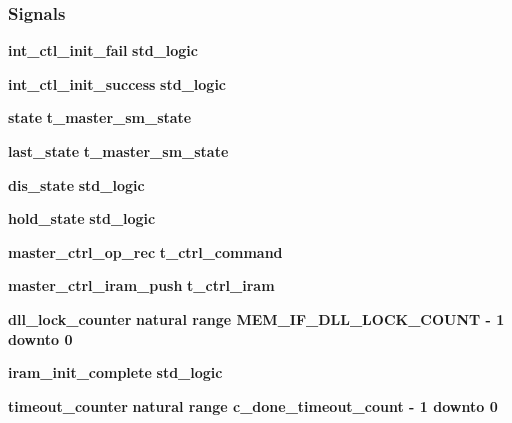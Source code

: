 \subsubsection*{Signals}
 \begin{DoxyCompactItemize}
\item 
{\bf int\+\_\+ctl\+\_\+init\+\_\+fail} {\bfseries \textcolor{comment}{std\+\_\+logic}\textcolor{vhdlchar}{ }} 
\item 
{\bf int\+\_\+ctl\+\_\+init\+\_\+success} {\bfseries \textcolor{comment}{std\+\_\+logic}\textcolor{vhdlchar}{ }} 
\item 
{\bf state} {\bfseries {\bfseries {\bf t\+\_\+master\+\_\+sm\+\_\+state}} \textcolor{vhdlchar}{ }} 
\item 
{\bf last\+\_\+state} {\bfseries {\bfseries {\bf t\+\_\+master\+\_\+sm\+\_\+state}} \textcolor{vhdlchar}{ }} 
\item 
{\bf dis\+\_\+state} {\bfseries \textcolor{comment}{std\+\_\+logic}\textcolor{vhdlchar}{ }} 
\item 
{\bf hold\+\_\+state} {\bfseries \textcolor{comment}{std\+\_\+logic}\textcolor{vhdlchar}{ }} 
\item 
{\bf master\+\_\+ctrl\+\_\+op\+\_\+rec} {\bfseries {\bfseries {\bf t\+\_\+ctrl\+\_\+command}} \textcolor{vhdlchar}{ }} 
\item 
{\bf master\+\_\+ctrl\+\_\+iram\+\_\+push} {\bfseries {\bfseries {\bf t\+\_\+ctrl\+\_\+iram}} \textcolor{vhdlchar}{ }} 
\item 
{\bf dll\+\_\+lock\+\_\+counter} {\bfseries \textcolor{comment}{natural}\textcolor{vhdlchar}{ }\textcolor{vhdlchar}{ }\textcolor{vhdlchar}{ }\textcolor{keywordflow}{range}\textcolor{vhdlchar}{ }\textcolor{vhdlchar}{ }\textcolor{vhdlchar}{ }\textcolor{vhdlchar}{ }{\bfseries {\bf M\+E\+M\+\_\+\+I\+F\+\_\+\+D\+L\+L\+\_\+\+L\+O\+C\+K\+\_\+\+C\+O\+U\+NT}} \textcolor{vhdlchar}{-\/}\textcolor{vhdlchar}{ } \textcolor{vhdldigit}{1} \textcolor{vhdlchar}{ }\textcolor{keywordflow}{downto}\textcolor{vhdlchar}{ }\textcolor{vhdlchar}{ } \textcolor{vhdldigit}{0} \textcolor{vhdlchar}{ }} 
\item 
{\bf iram\+\_\+init\+\_\+complete} {\bfseries \textcolor{comment}{std\+\_\+logic}\textcolor{vhdlchar}{ }} 
\item 
{\bf timeout\+\_\+counter} {\bfseries \textcolor{comment}{natural}\textcolor{vhdlchar}{ }\textcolor{vhdlchar}{ }\textcolor{vhdlchar}{ }\textcolor{keywordflow}{range}\textcolor{vhdlchar}{ }\textcolor{vhdlchar}{ }\textcolor{vhdlchar}{ }\textcolor{vhdlchar}{ }{\bfseries {\bf c\+\_\+done\+\_\+timeout\+\_\+count}} \textcolor{vhdlchar}{-\/}\textcolor{vhdlchar}{ } \textcolor{vhdldigit}{1} \textcolor{vhdlchar}{ }\textcolor{keywordflow}{downto}\textcolor{vhdlchar}{ }\textcolor{vhdlchar}{ } \textcolor{vhdldigit}{0} \textcolor{vhdlchar}{ }} 

\end{DoxyCompactItemize}
